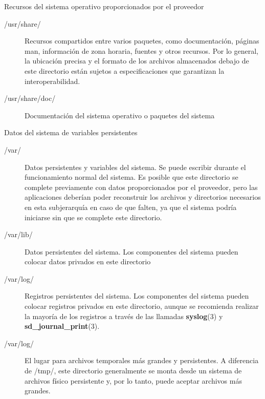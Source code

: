 \begin{frame}[c]{Recursos del sistema operativo proporcionados por el proveedor}
  \begin{description}
    \item [/usr/share/] Recursos compartidos entre varios paquetes, como
      documentación, páginas man, información de zona horaria, fuentes y otros
      recursos. Por lo general, la ubicación precisa y el formato de los
      archivos almacenados debajo de este directorio están sujetos a
      especificaciones que garantizan la interoperabilidad.
    \pausa
    \item [/usr/share/doc/] Documentación del sistema operativo o paquetes
      del sistema
  \end{description}
\end{frame}

\begin{frame}[c]{Datos del sistema de variables persistentes}
  \begin{description}
    \item [/var/] Datos persistentes y variables del sistema. Se puede escribir
      durante el funcionamiento normal del sistema. Es posible que este
      directorio se complete previamente con datos proporcionados por el
      proveedor, pero las aplicaciones deberían poder reconstruir los archivos
      y directorios necesarios en esta subjerarquía en caso de que falten, ya
      que el sistema podría iniciarse sin que se complete este directorio.
    \pausa
    \item [/var/lib/] Datos persistentes del sistema. Los componentes del
      sistema pueden colocar datos privados en este directorio
    \pausa
    \item [/var/log/] Registros persistentes del sistema. Los componentes del
      sistema pueden colocar registros privados en este directorio, aunque se
      recomienda realizar la mayoría de los registros a través de las
      llamadas \textbf{syslog}(3)  y \textbf{sd_journal_print}(3).
    \pausa
    \item [/var/log/] El lugar para archivos temporales más grandes y
      persistentes. A diferencia de /tmp/, este directorio generalmente se
      monta desde un sistema de archivos físico persistente y, por lo tanto,
      puede aceptar archivos más grandes.
  \end{description}
\end{frame}

